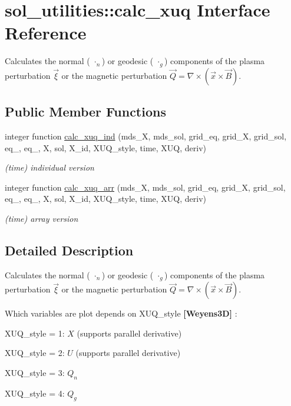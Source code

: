 \hypertarget{interfacesol__utilities_1_1calc__xuq}{}\section{sol\+\_\+utilities\+:\+:calc\+\_\+xuq Interface Reference}
\label{interfacesol__utilities_1_1calc__xuq}


Calculates the normal ( $\cdot_n$) or geodesic ( $\cdot_g$) components of the plasma perturbation $\vec{\xi}$ or the magnetic perturbation $\vec{Q} = \nabla \times \left(\vec{x} \times \vec{B}\right)$.  


\subsection*{Public Member Functions}
\begin{DoxyCompactItemize}
\item 
integer function \hyperlink{interfacesol__utilities_1_1calc__xuq_a5a102e1e32fac72b138a38df4c543134}{calc\+\_\+xuq\+\_\+ind} (mds\+\_\+X, mds\+\_\+sol, grid\+\_\+eq, grid\+\_\+X, grid\+\_\+sol, eq\+\_, eq\+\_, X, sol, X\+\_\+id, X\+U\+Q\+\_\+style, time, X\+UQ, deriv)
\begin{DoxyCompactList}\small\item\em (time) individual version \end{DoxyCompactList}\item 
integer function \hyperlink{interfacesol__utilities_1_1calc__xuq_a17d7f9af7119c48b7203cf683f80d304}{calc\+\_\+xuq\+\_\+arr} (mds\+\_\+X, mds\+\_\+sol, grid\+\_\+eq, grid\+\_\+X, grid\+\_\+sol, eq\+\_, eq\+\_, X, sol, X\+\_\+id, X\+U\+Q\+\_\+style, time, X\+UQ, deriv)
\begin{DoxyCompactList}\small\item\em (time) array version \end{DoxyCompactList}\end{DoxyCompactItemize}


\subsection{Detailed Description}
Calculates the normal ( $\cdot_n$) or geodesic ( $\cdot_g$) components of the plasma perturbation $\vec{\xi}$ or the magnetic perturbation $\vec{Q} = \nabla \times \left(\vec{x} \times \vec{B}\right)$. 

Which variables are plot depends on {\ttfamily X\+U\+Q\+\_\+style} {\bfseries [Weyens3D]} \+:
\begin{DoxyItemize}
\item {\ttfamily X\+U\+Q\+\_\+style} = 1\+: $X$ (supports parallel derivative)
\item {\ttfamily X\+U\+Q\+\_\+style} = 2\+: $U$ (supports parallel derivative)
\item {\ttfamily X\+U\+Q\+\_\+style} = 3\+: $Q_n$
\item {\ttfamily X\+U\+Q\+\_\+style} = 4\+: $Q_g$
\end{DoxyItemize}

